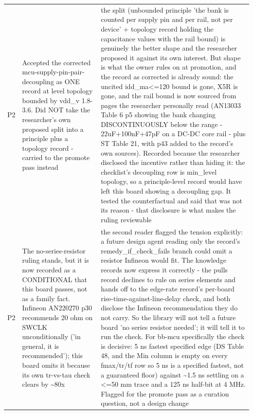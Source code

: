 \documentclass[11pt,a4paper]{article}
\begin{document}
{\begin{longtable}{lp{5.2cm}p{7.2cm}}
P2 & Accepted the corrected mcu-supply-pin-pair-decoupling as ONE record at level topology bounded by vdd\_v 1.8-3.6. Did NOT take the researcher's own proposed split into a principle plus a topology record - carried to the promote pass instead & the split (unbounded principle 'the bank is counted per supply pin and per rail, not per device' + topology record holding the capacitance values with the rail bound) is genuinely the better shape and the researcher proposed it against its own interest. But shape is what the owner rules on at promotion, and the record as corrected is already sound: the uncited idd\_ma\textless{}=120 bound is gone, X5R is gone, and the rail bound is now sourced from pages the researcher personally read (AN13033 Table 6 p5 showing the bank changing DISCONTINUOUSLY below the range - 22uF+100nF+47pF on a DC-DC core rail - plus ST Table 21, with p43 added to the record's own sources). Recorded because the researcher disclosed the incentive rather than hiding it: the checklist's decoupling row is min\_level topology, so a principle-level record would have left this board showing a decoupling gap. It tested the counterfactual and said that was not its reason - that disclosure is what makes the ruling reviewable \\
P2 & The no-series-resistor ruling stands, but it is now recorded as a CONDITIONAL that this board passes, not as a family fact. Infineon AN220270 p30 recommends 20 ohm on SWCLK unconditionally ('in general, it is recommended'); this board omits it because its own tr-vs-tau check clears by \textasciitilde{}80x & the second reader flagged the tension explicitly: a future design agent reading only the record's remedy\_if\_check\_fails branch could omit a resistor Infineon would fit. The knowledge records now express it correctly - the pulls record declines to rule on series elements and hands off to the edge-rate record's per-board rise-time-against-line-delay check, and both disclose the Infineon recommendation they do not carry. So the library will not tell a future board 'no series resistor needed'; it will tell it to run the check. For bb-mcu specifically the check is decisive: 5 ns fastest specified edge (DS Table 48, and the Min column is empty on every fmax/tr/tf row so 5 ns is a specified fastest, not a guaranteed floor) against \textasciitilde{}1.5 ns settling on a \textless{}=50 mm trace and a 125 ns half-bit at 4 MHz. Flagged for the promote pass as a curation question, not a design change \\

\end{longtable}}
\end{document}
